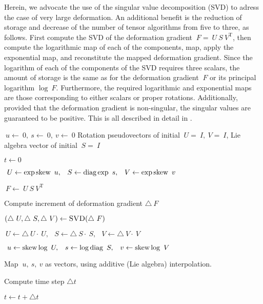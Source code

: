 \documentclass{article}
\newcommand{\svd}{\textsc{SVD}}
\newcommand{\diag}{\op{diag}}
\renewcommand{\skew}{\op{skew}}
\begin{document}
Herein, we advocate the use of the singular value decomposition
(\svd{}) to adress the case of very large deformation. An additional
benefit is the reduction of storage and decrease of the number of
tensor algorithms from five to three, as follows. First compute the
\svd{} of the deformation gradient $~F = ~U ~S ~V^{\text{T}}$, then
compute the logarithmic map of each of the components, map, apply the
exponential map, and reconstitute the mapped deformation
gradient. Since the logarithm of each of the components of the \svd{}
requires three scalars, the amount of storage is the same as for the
deformation gradient $~F$ or its principal logarithm $\log
~F$. Furthermore, the required logarithmic and exponential maps are
those corresponding to either scalars or proper
rotations. Additionally, provided that the deformation gradient is
non-singular, the singular values are guaranteed to be positive. This
is all described in detail in .

\begin{algorithm}[htbp]
  \footnotesize
  \begin{algorithmic}[1]

    \State
    $~u \gets ~0, ~s \gets ~0, ~v \gets ~0$
    \Comment
    Rotation pseudovectors of initial $~U=~I, ~V=~I$,
    Lie algebra vector of initial $~S=~I$

    \State $t \gets 0$

    \Repeat

    \State \label{alg:skew-diag}
    $~U \gets \exp \skew ~u, \enspace ~S \gets \diag \exp ~s, \enspace
    ~V \gets \exp \skew ~v$

    \State
    $~F \gets ~U ~S ~V^\text{T}$
    
    \State
    Compute increment of deformation gradient $\triangle ~F$

    \State \label{alg:svd}
    $\left(\triangle ~U, \triangle ~S, \triangle ~V\right)
    \gets \svd(\triangle ~F)$

    \State 
    $~U \gets \triangle ~U \cdot ~U,
    \enspace
    ~S \gets \triangle ~S \cdot ~S,
    \enspace
    ~V \gets \triangle ~V \cdot ~V$
    
    \State 
    $~u \gets \skew \log ~U,
    \enspace
    ~s \gets \log \diag ~S,
    \enspace
    ~v \gets \skew \log ~V$
    
    
    \State
    Map $~u, ~s, ~v$ as vectors, using additive (Lie algebra) interpolation.
    
    \EndIf

    \State
    Compute time step $\triangle t$

    \State $t \gets t + \triangle t$


  \end{algorithmic}
  \caption{Mapping algorithm for the deformation gradient $~F$ via the
    \svd{}.}
  \label{alg:defgrad-svd}
\end{algorithm}
\end{document}
